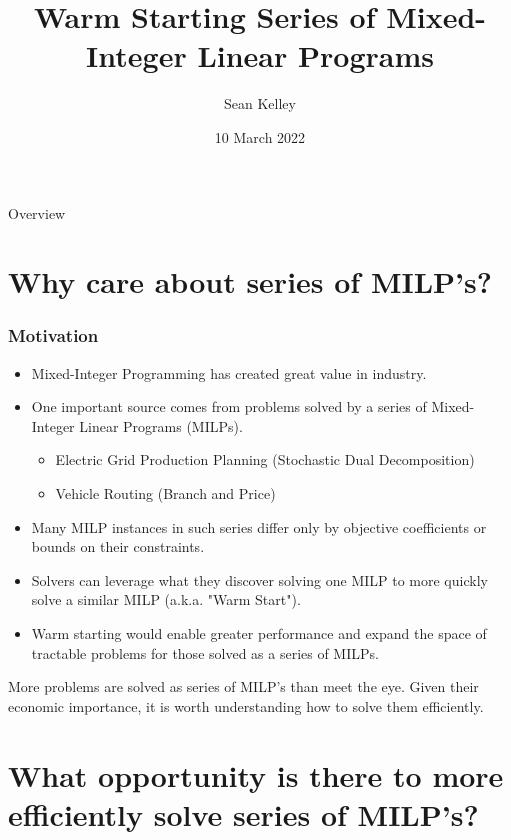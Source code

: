 \documentclass{beamer}
\title[Warm Starting Series of MILP's]{Warm Starting Series of Mixed-Integer Linear Programs}
\author{Sean Kelley} %
\date{10 March 2022} %
\begin{document}
	
	\begin{frame}
		\titlepage %
	\end{frame}

	\begin{frame}{Overview}
		\tableofcontents
	\end{frame}

	\section{Why care about series of MILP's?}
	
	\begin{frame}[t]
		\frametitle{Motivation}
		\small
		\begin{itemize}
			\item Mixed-Integer Programming has created great value in industry.
			\item One important source comes from problems solved by a series of Mixed-Integer Linear Programs (MILPs).
			\begin{itemize}
				\item Electric Grid Production Planning (Stochastic Dual Decomposition)
				\item Vehicle Routing (Branch and Price)
			\end{itemize}
			\item Many MILP instances in such series differ only by objective coefficients or bounds on their constraints.
			\item Solvers can leverage what they discover solving one MILP to more quickly solve a similar MILP (a.k.a. "Warm Start").
			\item Warm starting would enable greater performance and expand the space of tractable problems for those solved as a series of MILPs.
		\end{itemize}
		\vspace{-.25cm}
		\begin{block}{}
			More problems are solved as series of MILP's than meet the eye. Given their economic importance, it is worth understanding how to solve them efficiently.
		\end{block}
		\normalsize
	\end{frame}

	\section{What opportunity is there to more efficiently solve series of MILP's?}
\end{document}
